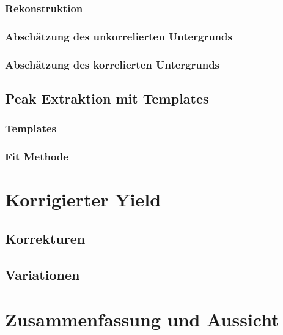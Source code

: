 \documentclass[]{article}
\begin{document}
	\subsubsection{Rekonstruktion}
	\subsubsection{Absch{\"a}tzung des unkorrelierten Untergrunds}
	\subsubsection{Absch{\"a}tzung des korrelierten Untergrunds}
	\subsection{Peak Extraktion mit Templates}
	\subsubsection{Templates}
	\subsubsection{Fit Methode}
	\section{Korrigierter Yield}
	\subsection{Korrekturen}
	\subsection{Variationen}
	\section{Zusammenfassung und Aussicht}
\end{document}
